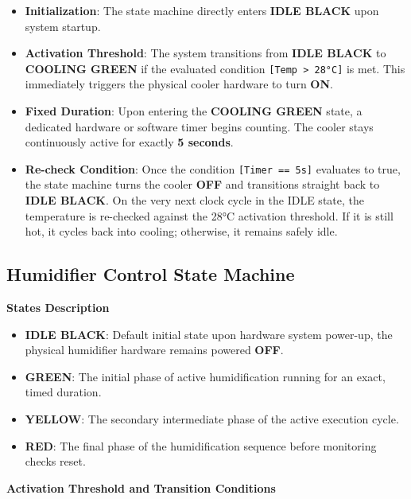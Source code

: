 \begin{itemize}
  \item \textbf{Initialization}: The state machine directly enters \textbf{IDLE BLACK} upon system startup.
  \item \textbf{Activation Threshold}: The system transitions from \textbf{IDLE BLACK} to \textbf{COOLING GREEN} if the
        evaluated condition \texttt{[Temp \textgreater{} 28°C]} is met. This immediately triggers the physical
        cooler hardware to turn \textbf{ON}.
  \item \textbf{Fixed Duration}: Upon entering the \textbf{COOLING GREEN} state, a dedicated hardware or software timer
        begins counting. The cooler stays continuously active for exactly \textbf{5 seconds}.
  \item \textbf{Re-check Condition}: Once the condition \texttt{[Timer == 5s]} evaluates to true, the state machine
        turns the cooler \textbf{OFF} and transitions straight back to \textbf{IDLE BLACK}. On the very next clock cycle
        in the IDLE state, the temperature is re-checked against the 28°C activation threshold. If it is still hot, it
        cycles back into cooling; otherwise, it remains safely idle.
\end{itemize}

\subsection{Humidifier Control State Machine}

\textbf{States Description}

\begin{itemize}
  \item \textbf{IDLE BLACK}: Default initial state upon hardware system power-up, the physical humidifier hardware
        remains powered \textbf{OFF}.
  \item \textbf{GREEN}: The initial phase of active humidification running for an exact, timed duration.
  \item \textbf{YELLOW}: The secondary intermediate phase of the active execution cycle.
  \item \textbf{RED}: The final phase of the humidification sequence before monitoring checks reset.
\end{itemize}

\textbf{Activation Threshold and Transition Conditions}

